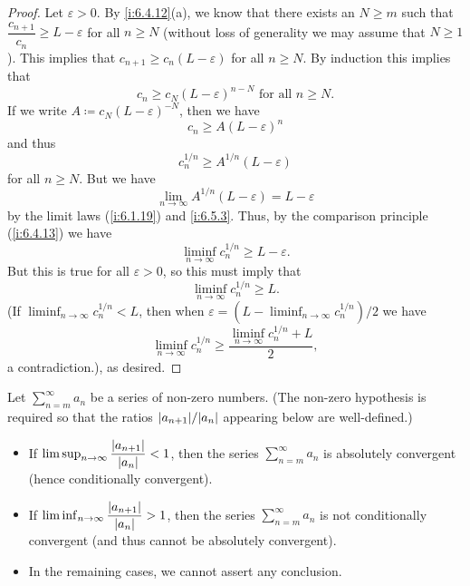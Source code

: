 \begin{proof}
  Let \(\varepsilon > 0\).
  By \cref{i:6.4.12}(a), we know that there exists an \(N \geq m\) such that \(\dfrac{c_{n + 1}}{c_n} \geq L - \varepsilon\) for all \(n \geq N\)
  (without loss of generality we may assume that \(N \geq 1\)).
  This implies that \(c_{n + 1} \geq c_n (L - \varepsilon)\) for all \(n \geq N\).
  By induction this implies that
  \[
    c_n \geq c_N (L - \varepsilon)^{n - N} \text{ for all } n \geq N.
  \]
  If we write \(A \coloneqq c_N (L - \varepsilon)^{-N}\), then we have
  \[
    c_n \geq A(L - \varepsilon)^n
  \]
  and thus
  \[
    c_n^{1 / n} \geq A^{1 / n} (L - \varepsilon)
  \]
  for all \(n \geq N\).
  But we have
  \[
    \lim_{n \to \infty} A^{1 / n} (L - \varepsilon) = L - \varepsilon
  \]
  by the limit laws (\cref{i:6.1.19}) and \cref{i:6.5.3}.
  Thus, by the comparison principle (\cref{i:6.4.13}) we have
  \[
    \liminf_{n \to \infty} c_n^{1 / n} \geq L - \varepsilon.
  \]
  But this is true for all \(\varepsilon > 0\), so this must imply that
  \[
    \liminf_{n \to \infty} c_n^{1 / n} \geq L.
  \]
  (If \(\liminf_{n \to \infty} c_n^{1 / n} < L\), then when \(\varepsilon = (L - \liminf_{n \to \infty} c_n^{1 / n}) / 2\) we have
  \[
    \liminf_{n \to \infty} c_n^{1 / n} \geq \dfrac{\liminf_{n \to \infty} c_n^{1 / n} + L}{2},
  \]
  a contradiction.), as desired.
\end{proof}

\begin{cor}\label{i:7.5.3}
  Let \(\sum_{n = m}^\infty a_n\) be a series of non-zero numbers.
  (The non-zero hypothesis is required so that the ratios \(\abs{a_{n + 1}} / \abs{a_n}\) appearing below are well-defined.)
  \begin{itemize}
    \item If \(\limsup_{n \to \infty} \dfrac{\left\lvert a_{n + 1}\right\rvert}{\left\lvert a_n\right\rvert} < 1\), then the series \(\sum_{n = m}^\infty a_n\) is absolutely convergent (hence conditionally convergent).
    \item If \(\liminf_{n \to \infty} \dfrac{\left\lvert a_{n + 1}\right\rvert}{\left\lvert a_n\right\rvert} > 1\), then the series \(\sum_{n = m}^\infty a_n\) is not conditionally convergent (and thus cannot be absolutely convergent).
    \item In the remaining cases, we cannot assert any conclusion.
  \end{itemize}
\end{cor}

